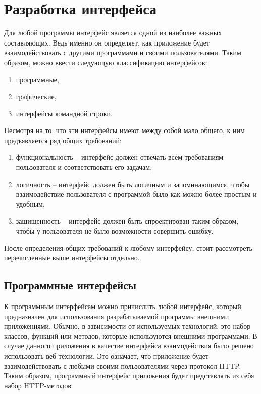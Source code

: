 \section*{Разработка интерфейса}

Для любой программы интерфейс является одной из наиболее важных составляющих.
Ведь именно он определяет, как приложение будет взаимодействовать с другими
программами и своими пользователями. Таким образом, можно ввести следующую
классификацию интерфейсов:

\begin{enumerate}
    \item программные,
    \item графические,
    \item интерфейсы командной строки.
\end{enumerate}

Несмотря на то, что эти интерфейсы имеют между собой мало общего, к ним 
предъявляется ряд общих требований:

\begin{enumerate}
    \item функциональность -- интерфейс должен отвечать всем требованиям пользователя и соответствовать его задачам,
    \item логичность -- интерфейс должен быть логичным и запоминающимся, чтобы взаимодействие пользователя
        с программой было как можно более простым и удобным,
    \item защищенность -- интерфейс должен быть спроектирован таким образом, чтобы у пользователя не было
        возможности совершить ошибку.
\end{enumerate}

После определения общих требований к любому интерфейсу, стоит рассмотреть перечисленные выше
интерфейсы отдельно.

\subsection*{Программные интерфейсы}

К программным интерфейсам можно причислить любой интерфейс, который предназначен для
использования разрабатываемой программы внешними приложениями. Обычно, в зависимости от
используемых технологий, это набор классов, функций или методов, которые используются
внешними программами. В случае данного приложения в качестве интерфейса взаимодействия
было решено использовать веб-технологии. Это означает, что приложение будет взаимодействовать
с любыми своими пользователями через протокол HTTP.
Таким образом, программный интерфейс приложения будет представлять из себя набор HTTP-методов.

